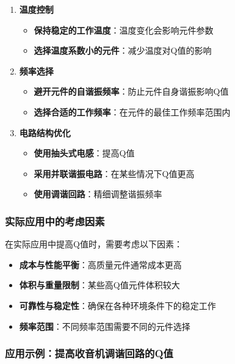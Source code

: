 \documentclass[12pt,UTF8]{ctexbook}
\begin{document}
\begin{enumerate}[leftmargin=3.5em]
    \item \textbf{温度控制}
    \begin{itemize}
        \item \textbf{保持稳定的工作温度}：温度变化会影响元件参数
        \item \textbf{选择温度系数小的元件}：减少温度对Q值的影响
    \end{itemize}
    
    \item \textbf{频率选择}
    \begin{itemize}
        \item \textbf{避开元件的自谐振频率}：防止元件自身谐振影响Q值
        \item \textbf{选择合适的工作频率}：在元件的最佳工作频率范围内
    \end{itemize}
    
    \item \textbf{电路结构优化}
    \begin{itemize}
        \item \textbf{使用抽头式电感}：提高Q值
        \item \textbf{采用并联谐振电路}：在某些情况下Q值更高
        \item \textbf{使用调谐回路}：精细调整谐振频率
    \end{itemize}
\end{enumerate}

\subsubsection{实际应用中的考虑因素}

在实际应用中提高Q值时，需要考虑以下因素：

\begin{itemize}[leftmargin=3.5em]
    \item \textbf{成本与性能平衡}：高质量元件通常成本更高
    \item \textbf{体积与重量限制}：某些高Q值元件体积较大
    \item \textbf{可靠性与稳定性}：确保在各种环境条件下的稳定工作
    \item \textbf{频率范围}：不同频率范围需要不同的元件选择
\end{itemize}

\subsubsection{应用示例：提高收音机调谐回路的Q值}
\end{document}
